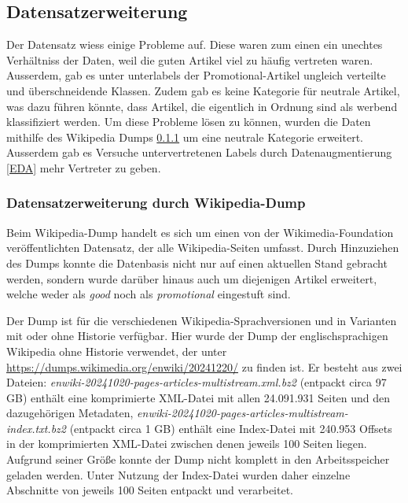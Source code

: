 \subsection{Datensatzerweiterung}
\label{ProblemeDatensatz}
Der Datensatz wiess einige Probleme auf. Diese waren zum einen ein unechtes Verhältniss der Daten, weil die guten Artikel viel zu häufig vertreten waren. Ausserdem, gab es unter unterlabels der Promotional-Artikel ungleich verteilte und überschneidende Klassen. Zudem gab es keine Kategorie für neutrale Artikel, was dazu führen könnte, dass Artikel, die eigentlich in Ordnung sind als werbend klassifiziert werden.
Um diese Probleme lösen zu können, wurden die Daten mithilfe des Wikipedia Dumps \ref{WPDump} um eine neutrale Kategorie erweitert. Ausserdem gab es Versuche untervertretenen Labels durch Datenaugmentierung \ref{EDA} mehr Vertreter zu geben.

\subsubsection{Datensatzerweiterung durch Wikipedia-Dump}
\label{WPDump}
Beim Wikipedia-Dump handelt es sich um einen von der Wikimedia-Foundation veröffentlichten Datensatz, der alle Wikipedia-Seiten umfasst. Durch Hinzuziehen des Dumps konnte die Datenbasis nicht nur auf einen aktuellen Stand gebracht werden, sondern wurde darüber hinaus auch um diejenigen Artikel erweitert, welche weder als \emph{good} noch als \emph{promotional} eingestuft sind.

Der Dump ist für die verschiedenen Wikipedia-Sprachversionen und in Varianten mit oder ohne Historie verfügbar. Hier wurde der Dump der englischsprachigen Wikipedia ohne Historie verwendet, der unter \url{https://dumps.wikimedia.org/enwiki/20241220/} zu finden ist. Er besteht aus zwei Dateien: \emph{enwiki-20241020-pages-articles-multistream.xml.bz2} (entpackt circa 97 GB) enthält eine komprimierte XML-Datei mit allen 24.091.931 Seiten und den dazugehörigen Metadaten, \emph{enwiki-20241020-pages-articles-multistream-index.txt.bz2} (entpackt circa 1 GB) enthält eine Index-Datei mit 240.953 Offsets in der komprimierten XML-Datei zwischen denen jeweils 100 Seiten liegen. Aufgrund seiner Größe konnte der Dump nicht komplett in den Arbeitsspeicher geladen werden. Unter Nutzung der Index-Datei wurden daher einzelne Abschnitte von jeweils 100 Seiten entpackt und verarbeitet.

